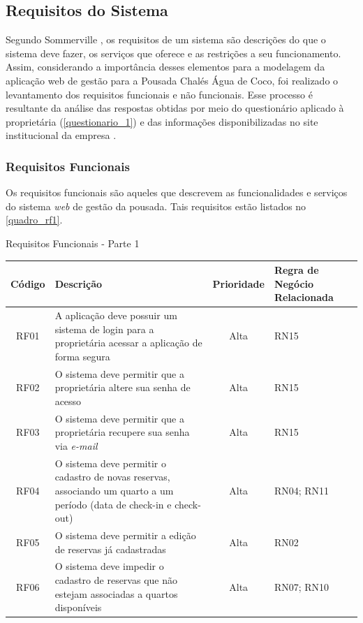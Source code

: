 \documentclass[
	12pt,				%
	openany,			%
	twoside,			%
	a4paper,			%
	english,			%
	french,				%
	spanish,			%
	brazil				%
	]{abntex2}
\begin{document}
\subsection{Requisitos do Sistema}
Segundo Sommerville \cite[p.57]{sommerville2011}, os requisitos de um sistema são descrições do que o sistema deve fazer, os serviços que oferece e as restrições a seu funcionamento. Assim, considerando a importância desses elementos para a modelagem da aplicação web de gestão para a Pousada Chalés Água de Coco, foi realizado o levantamento dos requisitos funcionais e não funcionais. Esse processo é resultante da análise das respostas obtidas por meio do questionário aplicado à proprietária (\autoref{questionario_1}) e das informações disponibilizadas no site institucional da empresa \cite{pousada_chales_agua_de_coco}.
\subsubsection{Requisitos Funcionais}
Os requisitos funcionais são aqueles que descrevem as funcionalidades e serviços do sistema \textit{web} de gestão da pousada. Tais requisitos estão listados no \autoref{quadro_rf1}.
%
\begin{quadro}[H]
	\caption{Requisitos Funcionais - Parte 1}
	\label{quadro_rf1}
	\begin{tabular}{|c|p{5cm}|c|p{4cm}|}
		\hline
		\textbf{Código} & \textbf{Descrição} & \textbf{Prioridade} & \textbf{Regra de Negócio Relacionada} \\ \hline
		RF01 & A aplicação deve possuir um sistema de login para a proprietária acessar a aplicação de forma segura & Alta & RN15 \\ \hline
		RF02 & O sistema deve permitir que a proprietária altere sua senha de acesso  & Alta & RN15 \\ \hline
		RF03 & O sistema deve permitir que a proprietária recupere sua senha via \textit{e-mail} & Alta & RN15 \\ \hline
		RF04 & O sistema deve permitir o cadastro de novas reservas, associando um quarto a um período (data de check-in e check-out) & Alta & RN04; RN11 \\ \hline
		RF05 & O sistema deve permitir a edição de reservas já cadastradas & Alta & RN02 \\ \hline
		RF06 & O sistema deve impedir o cadastro de reservas que não estejam associadas a quartos disponíveis & Alta & RN07; RN10 \\ \hline
	\end{tabular}
\end{quadro}
\end{document}
